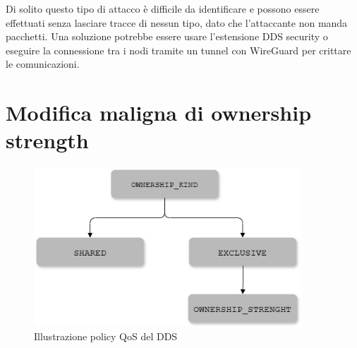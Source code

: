 Di solito questo tipo di attacco è difficile da identificare e possono essere
effettuati senza lasciare tracce di nessun tipo, dato che l'attaccante non 
manda pacchetti.
Una soluzione potrebbe essere usare l'estensione DDS security o 
eseguire la connessione tra i nodi tramite un tunnel con WireGuard per crittare
le comunicazioni.






%     






\section{Modifica maligna di ownership strength}

\begin{figure}[H]
    \centering
    \includegraphics[width=10cm, keepaspectratio]{img/Policy QoS DDS_2.jpg}
    \caption{Illustrazione policy QoS del DDS}\label{Mappa QoS}
\end{figure}


